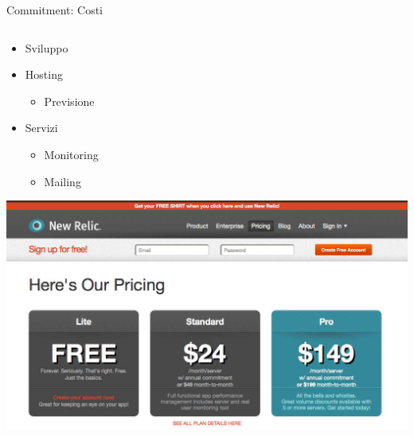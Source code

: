 	\begin{frame}{Commitment: Costi}
		
		\begin{columns}[T]
		    \begin{column}{.5\textwidth}
			
				\begin{itemize}
					\item Sviluppo
					\item Hosting
						\begin{itemize}
							\item Previsione
						\end{itemize}
					\item Servizi
					\begin{itemize}
						\item Monitoring
						\item Mailing
					\end{itemize}
				\end{itemize}
				
				\vspace*{0.2cm}
				\hspace*{0.5cm} \includegraphics[scale=0.14]{images/costs-3}
    		\end{column}


\end{columns}
\end{frame}
